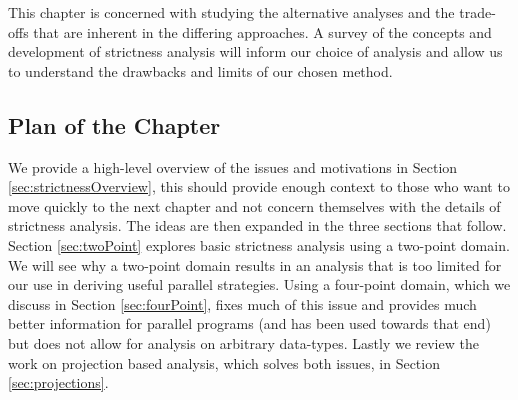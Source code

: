 This chapter is concerned with studying the alternative analyses and the
trade-offs that are inherent in the differing approaches. A survey of the
concepts and development of strictness analysis will inform our choice of
analysis and allow us to understand the drawbacks and limits of our chosen
method.

\subsection*{Plan of the Chapter}

We provide a high-level overview of the issues and motivations in Section
\ref{sec:strictnessOverview}, this should provide enough context to those who
want to move quickly to the next chapter and not concern themselves with the
details of strictness analysis. The ideas are then expanded in the three
sections that follow. Section \ref{sec:twoPoint} explores basic strictness
analysis using a two-point domain. We will see why a two-point domain results
in an analysis that is too limited for our use in deriving useful parallel
strategies. Using a four-point domain, which we discuss in Section
\ref{sec:fourPoint}, fixes much of this issue and provides much better
information for parallel programs (and has been used towards that end) but does
not allow for analysis on arbitrary data-types. Lastly we review the work on
projection based analysis, which solves both issues, in Section
\ref{sec:projections}.
